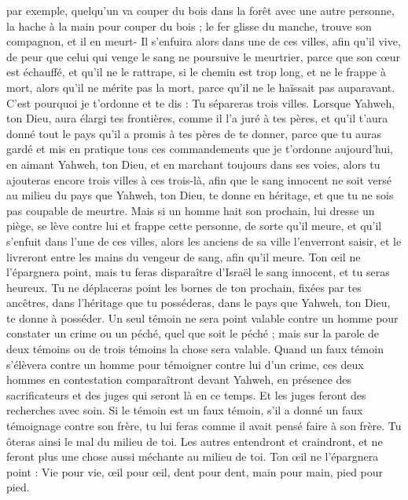 \begin{multicols}{2}
par exemple, quelqu'un va couper du bois dans la forêt avec une autre personne, la hache à la main pour couper du bois ; le fer glisse du manche, trouve son compagnon, et il en meurt- Il s'enfuira alors dans une de ces villes, afin qu'il vive,
de peur que celui qui venge le sang ne poursuive le meurtrier, parce que son cœur est échauffé, et qu'il ne le rattrape, si le chemin est trop long, et ne le frappe à mort, alors qu’il ne mérite pas la mort, parce qu'il ne le haïssait pas auparavant.
C'est pourquoi je t’ordonne et te dis : Tu sépareras trois villes.
Lorsque Yahweh, ton Dieu, aura élargi tes frontières, comme il l'a juré à tes pères, et qu'il t’aura donné tout le pays qu'il a promis à tes pères de te donner,
parce que tu auras gardé et mis en pratique tous ces commandements que je t’ordonne aujourd'hui, en aimant Yahweh, ton Dieu, et en marchant toujours dans ses voies, alors tu ajouteras encore trois villes à ces trois-là,
afin que le sang innocent ne soit versé au milieu du pays que Yahweh, ton Dieu, te donne en héritage, et que tu ne sois pas coupable de meurtre.
Mais si un homme hait son prochain, lui dresse un piège, se lève contre lui et frappe cette personne, de sorte qu’il meure, et qu'il s'enfuit dans l'une de ces villes,
alors les anciens de sa ville l’enverront saisir, et le livreront entre les mains du vengeur de sang, afin qu'il meure.
Ton œil ne l'épargnera point, mais tu feras disparaître d’Israël le sang innocent, et tu seras heureux.
Tu ne déplaceras point les bornes de ton prochain, fixées par tes ancêtres, dans l'héritage que tu posséderas, dans le pays que Yahweh, ton Dieu, te donne à posséder.
Un seul témoin ne sera point valable contre un homme pour constater un crime ou un péché, quel que soit le péché ; mais sur la parole de deux témoins ou de trois témoins la chose sera valable.
Quand un faux témoin s'élèvera contre un homme pour témoigner contre lui d’un crime,
ces deux hommes en contestation comparaîtront devant Yahweh, en présence des sacrificateurs et des juges qui seront là en ce temps.
Et les juges feront des recherches avec soin. Si le témoin est un faux témoin, s’il a donné un faux témoignage contre son frère,
tu lui feras comme il avait pensé faire à son frère. Tu ôteras ainsi le mal du milieu de toi.
Les autres entendront et craindront, et ne feront plus une chose aussi méchante au milieu de toi.
Ton œil ne l'épargnera point : Vie pour vie, œil pour œil, dent pour dent, main pour main, pied pour pied.

\end{multicols}

